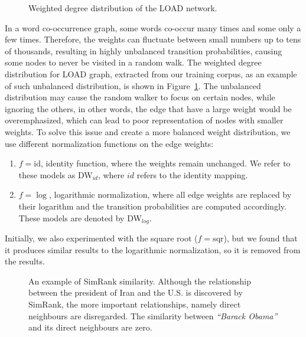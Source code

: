 \begin{figure}
\centering 
\resizebox{0.6\textwidth}{0.6\textwidth}{      

}
\caption{Weighted degree distribution of the LOAD network.}
\label{fig:degrees}
\end{figure}
\noindent
In a word co-occurrence graph, some words co-occur many times and some only a few times. Therefore, the weights can fluctuate between small numbers up to tens of thousands, resulting in highly unbalanced transition probabilities, causing some nodes to never be visited in a random walk. The weighted degree distribution for LOAD graph, extracted from our training corpus, as an example of such unbalanced distribution, is shown in Figure~\ref{fig:degrees}. The unbalanced distribution may cause the random walker to focus on certain nodes, while ignoring the others, in other words, the edge that have a large weight would be overemphasized, which can lead to poor representation of nodes with smaller weights. To solve this issue and create a more balanced weight distribution, we use different normalization functions on the edge weights:
\noindent
\begin{enumerate}
\item  $f=\mathrm{id}$, identity function, where the weights remain unchanged. We refer to these models as DW$_{id}$, where $id$ refers to the identity mapping.
\item  $f=\log$, logarithmic normalization, where all edge weights are replaced by their logarithm and the transition probabilities are computed accordingly. These models are denoted by DW$_{log}$.
\end{enumerate}
Initially, we also experimented with the square root ($f=\mathrm{sqr}$), but we found that it produces similar results to the logarithmic normalization, so it is removed from the results.\\

\begin{figure}
\centering 
\resizebox{0.50\textwidth}{0.35\textwidth}{      

}
\caption{An example of SimRank similarity. Although the relationship between the president of Iran and the U.S. is discovered by SimRank, the more important relationships, namely direct neighbours are disregarded. The similarity between \emph{``Barack Obama''} and its direct neighbours are zero.}
\label{fig:simrank}
\end{figure}

